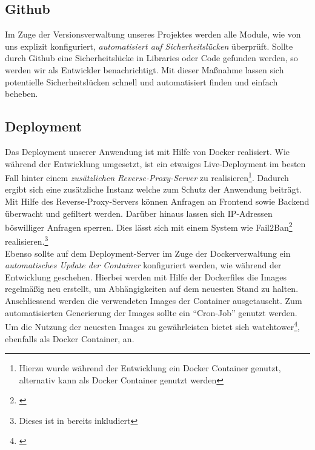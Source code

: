 \subsection{Github}

Im Zuge der Versionsverwaltung unseres Projektes werden alle Module, wie von uns explizit konfiguriert, \textit{automatisiert auf Sicherheitslücken} überprüft.
Sollte durch Github eine Sicherheitslücke in Libraries oder Code gefunden werden, so werden wir als Entwickler benachrichtigt.
Mit dieser Maßnahme lassen sich potentielle Sicherheitslücken schnell und automatisiert finden und einfach beheben.\\

\subsection{Deployment}

Das Deployment unserer Anwendung ist mit Hilfe von Docker realisiert.
Wie während der Entwicklung umgesetzt, ist ein etwaiges Live-Deployment im besten Fall hinter einem \textit{zusätzlichen Reverse-Proxy-Server} zu realisieren\footnote{Hierzu wurde während der Entwicklung ein \cite{swag} Docker Container genutzt, alternativ kann \cite{traefik} als Docker Container genutzt werden}.
Dadurch ergibt sich eine zusätzliche Instanz welche zum Schutz der Anwendung beiträgt. Mit Hilfe des Reverse-Proxy-Servers können Anfragen an Frontend sowie Backend überwacht und gefiltert werden.
Darüber hinaus lassen sich IP-Adressen böswilliger Anfragen sperren.
Dies lässt sich mit einem System wie Fail2Ban\footnote{\cite{Fail2Ban}} realisieren.\footnote{Dieses ist in \cite{swag} bereits inkludiert}\\
Ebenso sollte auf dem Deployment-Server im Zuge der Dockerverwaltung ein \textit{automatisches Update der Container} konfiguriert werden, wie während der Entwicklung geschehen.
Hierbei werden mit Hilfe der Dockerfiles die Images regelmäßig neu erstellt, um Abhängigkeiten auf dem neuesten Stand zu halten.
Anschliessend werden die verwendeten Images der Container ausgetauscht.
Zum automatisierten Generierung der Images sollte ein \enquote{Cron-Job} genutzt werden.
Um die Nutzung der neuesten Images zu gewährleisten bietet sich watchtower\footnote{\cite{watchtower}}, ebenfalls als Docker Container, an.
